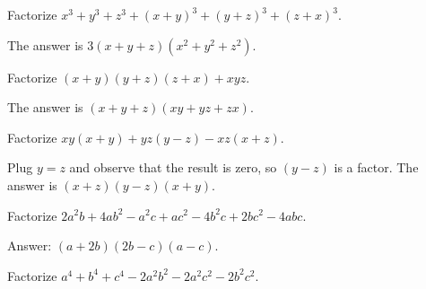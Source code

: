 \begin{tcolorbox}
\begin{question}
Factorize $x^3+y^3+z^3+(x+y)^3+(y+z)^3+(z+x)^3$.
\end{question}
\end{tcolorbox}

\begin{solution}
The answer is $3(x+y+z)(x^2+y^2+z^2)$.
\end{solution}


\begin{tcolorbox}
\begin{question}
Factorize $(x+y)(y+z)(z+x)+xyz$.
\end{question}
\end{tcolorbox}

\begin{solution}
The answer is $(x+y+z)(xy+yz+zx)$.
\end{solution}


\begin{tcolorbox}
\begin{question}
Factorize $xy(x+y)+yz(y-z)-xz(x+z)$.
\end{question}
\end{tcolorbox}

\begin{solution}[name=Solution by Parviz Shahriari]
Plug $y=z$ and observe that the result is zero, so $(y-z)$ is a factor. The answer is $(x+z)(y-z)(x+y)$.
\end{solution}

\begin{tcolorbox}
\begin{question}
Factorize $2a^2b+4ab^2-a^2c+ac^2-4b^2c+2bc^2-4abc$.
\end{question}
\end{tcolorbox}

\begin{solution}[name=Solution by Parviz Shahriari]
Answer: $(a+2b)(2b-c)(a-c)$.
\end{solution}


\begin{tcolorbox}
\begin{question}
Factorize $a^4+b^4+c^4 - 2a^2b^2 - 2a^2c^2 - 2b^2c^2$.
\end{question}
\end{tcolorbox}

